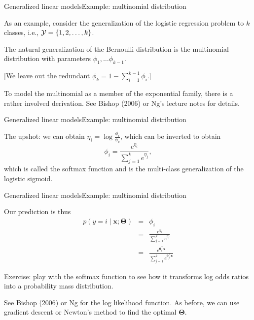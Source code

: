 \documentclass{beamer}
\renewcommand{\vec}[1]{\boldsymbol{#1}}
\begin{document}
\begin{frame}{Generalized linear models}{Example: multinomial distribution}

  As an example, consider the generalization of the logistic
  regression problem to $k$ classes, i.e., ${\cal Y} = \{ 1, 2,
  \ldots, k \}$.

  \medskip

  The natural generalization of the Bernoulli distribution is the
  \alert{multinomial distribution} with parameters $\phi_1, \ldots \phi_{k-1}$.

  \medskip

  [We leave out the redundant $\phi_k = 1 - \sum_{i=1}^{k-1} \phi_i$.]

  \medskip

  To model the multinomial as a member of the exponential family,
  there is a rather involved derivation. See Bishop (2006) or Ng's
  lecture notes for details.
  
\end{frame}


\begin{frame}{Generalized linear models}{Example: multinomial distribution}

  The upshot: we can obtain $\eta_i = \log\frac{\phi_i}{\phi_k}$, which can be
  inverted to obtain
  \[ \phi_i = \frac{e^{\eta_i}}{\sum_{j=1}^k e^{\eta_j}}, \]
  which is called the \alert{softmax function} and is the multi-class
  generalization of the logistic sigmoid.

\end{frame}


\begin{frame}{Generalized linear models}{Example: multinomial distribution}

  Our prediction is thus
  \begin{eqnarray}
    p(y=i \mid \vec{x} ; \vec{\Theta}) & = & \phi_i \nonumber \\
    & = & \frac{e^{\eta_i}}{\sum_{j=1}^k e^{\eta_j}} \nonumber \\
    & = & \frac{e^{\vec{\theta}_i^\top\vec{x}}}{\sum_{j=1}^k e^{\vec{\theta}_j^\top\vec{x}}} \nonumber
  \end{eqnarray}

  \medskip

  \alert{Exercise}: play with the softmax function to see how it
  transforms log odds ratios into a probability mass distribution.

  \medskip

  See Bishop (2006) or Ng for the log likelihood function. As before,
  we can use gradient descent or Newton's method to find the optimal
  $\vec{\Theta}$.

\end{frame}
\end{document}
